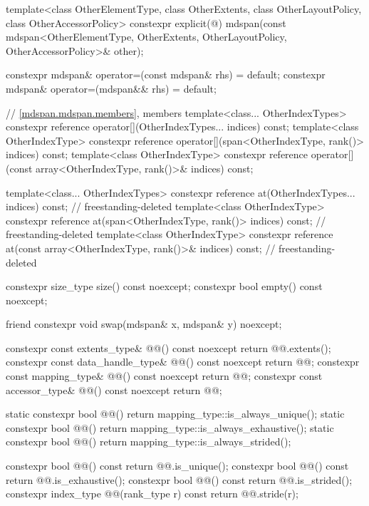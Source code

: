 \begin{codeblock}
{{    template<class OtherElementType, class OtherExtents,
             class OtherLayoutPolicy, class OtherAccessorPolicy>
      constexpr explicit(@\seebelow@)
        mdspan(const mdspan<OtherElementType, OtherExtents,
                            OtherLayoutPolicy, OtherAccessorPolicy>& other);

    constexpr mdspan& operator=(const mdspan& rhs) = default;
    constexpr mdspan& operator=(mdspan&& rhs) = default;

    // \ref{mdspan.mdspan.members}, members
    template<class... OtherIndexTypes>
      constexpr reference operator[](OtherIndexTypes... indices) const;
    template<class OtherIndexType>
      constexpr reference operator[](span<OtherIndexType, rank()> indices) const;
    template<class OtherIndexType>
      constexpr reference operator[](const array<OtherIndexType, rank()>& indices) const;

    template<class... OtherIndexTypes>
      constexpr reference
        at(OtherIndexTypes... indices) const;                           // freestanding-deleted
    template<class OtherIndexType>
      constexpr reference
        at(span<OtherIndexType, rank()> indices) const;                 // freestanding-deleted
    template<class OtherIndexType>
      constexpr reference
        at(const array<OtherIndexType, rank()>& indices) const;         // freestanding-deleted

    constexpr size_type size() const noexcept;
    constexpr bool empty() const noexcept;

    friend constexpr void swap(mdspan& x, mdspan& y) noexcept;

    constexpr const extents_type& @@() const noexcept { return @@.extents(); }
    constexpr const data_handle_type& @@() const noexcept { return @@; }
    constexpr const mapping_type& @@() const noexcept { return @@; }
    constexpr const accessor_type& @@() const noexcept { return @@; }

    static constexpr bool @@()
      { return mapping_type::is_always_unique(); }
    static constexpr bool @@()
      { return mapping_type::is_always_exhaustive(); }
    static constexpr bool @@()
      { return mapping_type::is_always_strided(); }

    constexpr bool @@() const
      { return @@.is_unique(); }
    constexpr bool @@() const
      { return @@.is_exhaustive(); }
    constexpr bool @@() const
      { return @@.is_strided(); }
    constexpr index_type @@(rank_type r) const
      { return @@.stride(r); }

}}
\end{codeblock}
